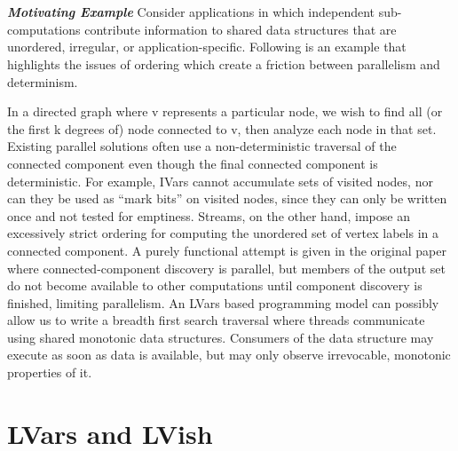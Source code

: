\documentclass[twocolumn]{article}
\begin{document}
\\ \\ 
\textit{\textbf{Motivating Example}} Consider applications in which independent sub-computations contribute information to shared data structures that are unordered, irregular, or application-specific. Following is an example that highlights the issues of ordering which create a friction between parallelism and determinism. \par 
In a directed graph where v represents a particular node, we wish to find all (or the first k degrees of) node connected to v, then analyze each node in that set. Existing parallel solutions\cite{kuper} often use a non-deterministic traversal of the connected component even though the final connected component is deterministic. For example, IVars cannot accumulate sets of visited nodes, nor can they be used as “mark bits” on visited nodes, since they can only be written once and not tested for emptiness. Streams, on the other hand, impose an excessively strict ordering for computing the unordered set of vertex labels in a connected component. A purely functional attempt is given in the original paper\cite{lkuper} where connected-component discovery is parallel, but members of the output set do not become available to other computations until component discovery is finished, limiting parallelism. 
An LVars\cite{lkuper} based programming model can possibly allow us to write a breadth first search traversal where threads communicate using shared monotonic data structures. Consumers of the data structure may execute as soon as data is available, but may only observe irrevocable, monotonic properties of it. 

\section{LVars and LVish}
\end{document}
